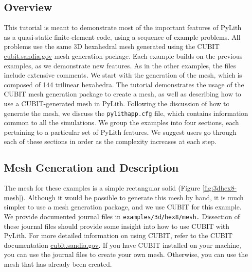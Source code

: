 \subsection{Overview}

This tutorial is meant to demonstrate most of the important features
of PyLith as a quasi-static finite-element code, using a sequence
of example problems. All problems use the same 3D hexahedral mesh
generated using the CUBIT \url{cubit.sandia.gov} mesh generation
package. Each example builds on the previous examples, as we demonstrate
new features. As in the other examples, the files include extensive
comments. We start with the generation of the mesh, which is composed
of 144 trilinear hexahedra. The tutorial demonstrates the usage of
the CUBIT mesh generation package to create a mesh, as well as describing
how to use a CUBIT-generated mesh in PyLith. Following the discussion
of how to generate the mesh, we discuss the \texttt{pylithapp.cfg}
file, which contains information common to all the simulations. We
group the examples into four sections, each pertaining to a particular
set of PyLith features. We suggest users go through each of these
sections in order as the complexity increases at each step. 


\subsection{Mesh Generation and Description}

The mesh for these examples is a simple rectangular solid (Figure
\ref{fig:3dhex8-mesh}). Although it would be possible to generate
this mesh by hand, it is much simpler to use a mesh generation package,
and we use CUBIT for this example. We provide documented journal files
in \texttt{examples/3d/hex8/mesh.} Dissection of these journal files
should provide some insight into how to use CUBIT with PyLith. For
more detailed information on using CUBIT, refer to the CUBIT documentation
\url{cubit.sandia.gov}. If you have CUBIT installed on your machine,
you can use the journal files to create your own mesh. Otherwise,
you can use the mesh that has already been created.

